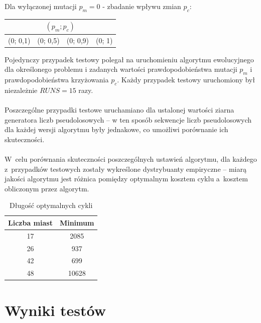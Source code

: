 \documentclass[12pt, a4paper]{article}
\begin{document}
\bigskip

Dla wyłączonej mutacji $p_m = 0$ - zbadanie wpływu zmian $p_c$:
\begin{center}
\begin{tabular}{|l|l|l|l|}
\hline
\multicolumn{4}{|c|}{$(p_m; p_c)$} \\
\hline
(0; 0,1) & (0; 0,5) & (0; 0,9) & (0; 1)\\
\hline
\end{tabular}
\end{center}

\bigskip

Pojedynczy przypadek testowy polegał na uruchomieniu algorytmu ewolucyjnego dla określonego 
problemu i zadanych wartości prawdopodobieństwa mutacji $p_m$ i prawdopodobieństwa 
krzyżowania $p_c$. Każdy przypadek testowy uruchomiony był niezależnie $RUNS = 15$ razy.\\
\\
Poszczególne przypadki testowe uruchamiano dla ustalonej wartości ziarna generatora 
liczb pseudolosowych -- w ten sposób sekwencje liczb pseudolosowych dla każdej wersji 
algorytmu były jednakowe, co umożliwi porównanie ich skuteczności.\\
\\
W~celu porównania skuteczności poszczególnych ustawień algorytmu, dla każdego z~przypadków testowych zostały wykreślone 
dystrybuanty empiryczne -- miarą jakości algorytmu jest różnica pomiędzy optymalnym 
kosztem cyklu a~kosztem obliczonym przez algorytm.

\begin{table}[h]
  \centering
  \begin{tabular}{ | c | c | }
    \hline
    Liczba miast & Minimum\\
    \hline
    17 & 2085\\
    \hline
    26 & 937\\
    \hline
    42 & 699\\
    \hline
    48 & 10628\\
    \hline
  \end{tabular}
  \caption{Długość optymalnych cykli}
\end{table}

\section{Wyniki testów}
\end{document}
